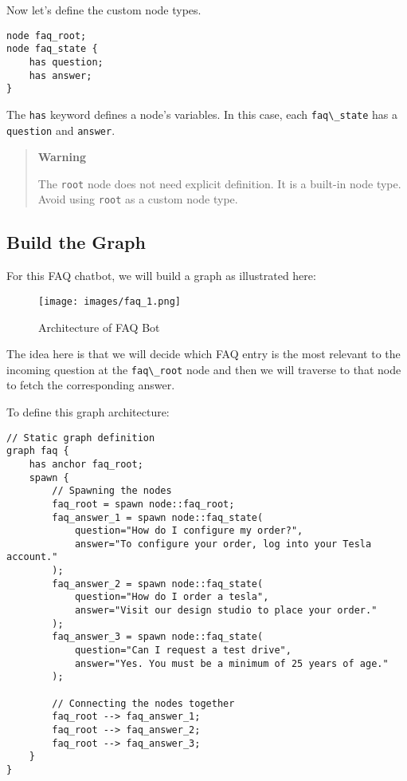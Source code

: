 Now let's define the custom node types.

\begin{lstlisting}
node faq_root;
node faq_state {
    has question;
    has answer;
}
\end{lstlisting}

The \passthrough{\lstinline!has!} keyword defines a node's variables. In
this case, each \passthrough{\lstinline!faq\_state!} has a
\passthrough{\lstinline!question!} and \passthrough{\lstinline!answer!}.

\begin{quote}
\textbf{Warning}

The \passthrough{\lstinline!root!} node does not need explicit
definition. It is a built-in node type. Avoid using
\passthrough{\lstinline!root!} as a custom node type.
\end{quote}

\hypertarget{build-the-graph}{%
\subsection{Build the Graph}\label{build-the-graph}}

For this FAQ chatbot, we will build a graph as illustrated here:

\begin{figure}
\centering
\texttt{[image: images/faq\_1.png]}
\caption{Architecture of FAQ Bot}
\end{figure}

The idea here is that we will decide which FAQ entry is the most
relevant to the incoming question at the
\passthrough{\lstinline!faq\_root!} node and then we will traverse to
that node to fetch the corresponding answer.

To define this graph architecture:

\begin{lstlisting}
// Static graph definition
graph faq {
    has anchor faq_root;
    spawn {
        // Spawning the nodes
        faq_root = spawn node::faq_root;
        faq_answer_1 = spawn node::faq_state(
            question="How do I configure my order?",
            answer="To configure your order, log into your Tesla account."
        );
        faq_answer_2 = spawn node::faq_state(
            question="How do I order a tesla",
            answer="Visit our design studio to place your order."
        );
        faq_answer_3 = spawn node::faq_state(
            question="Can I request a test drive",
            answer="Yes. You must be a minimum of 25 years of age."
        );

        // Connecting the nodes together
        faq_root --> faq_answer_1;
        faq_root --> faq_answer_2;
        faq_root --> faq_answer_3;
    }
}
\end{lstlisting}

